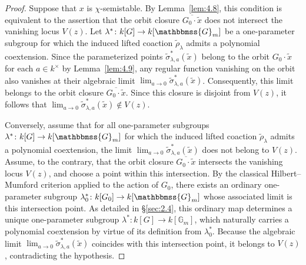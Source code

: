 \documentclass[11pt,a4paper,reqno,noamsfonts]{amsart}
\numberwithin{equation}{section}
\theoremstyle{definition}
\theoremstyle{remark}
\newcommand{\GG}{\ensuremath{\mathbbmss{G}}}
\begin{document}
\begin{proof}
Suppose that $x$ is $\chi$-semistable. By Lemma~\ref{lem:4.8}, this condition is equivalent to the assertion that the orbit closure $\overline{G_0 \cdot \tilde{x}}$ does not intersect the vanishing locus $V(z)$. Let $\lambda^* \colon k[G] \to k[\GG_m]$ be a one-parameter subgroup for which the induced lifted coaction $\tilde{\rho}_{\lambda}$ admits a polynomial coextension. Since the parameterized points $\tilde{\sigma}_{\lambda,a}^*(\tilde{x})$ belong to the orbit $G_0 \cdot \tilde{x}$ for each $a \in k^\times$ by Lemma~\ref{lem:4.9}, any regular function vanishing on the orbit also vanishes at their algebraic limit $\displaystyle \lim_{a \to 0} \tilde{\sigma}_{\lambda,a}^*(\tilde{x})$. Consequently, this limit belongs to the orbit closure $\overline{G_0 \cdot \tilde{x}}$. Since this closure is disjoint from $V(z)$, it follows that $\displaystyle\lim_{a \to 0} \tilde{\sigma}_{\lambda,a}^*(\tilde{x}) \notin V(z)$.

Conversely, assume that for all one-parameter subgroups $\lambda^* \colon k[G] \to k[\GG_m]$ for which the induced lifted coaction $\tilde{\rho}_{\lambda}$ admits a polynomial coextension, the limit $\displaystyle \lim_{a \to 0} \tilde{\sigma}_{\lambda,a}^*(\tilde{x})$ does not belong to $V(z)$. Assume, to the contrary, that the orbit closure $\overline{G_0 \cdot \tilde{x}}$ intersects the vanishing locus $V(z)$, and choose a point within this intersection. By the classical Hilbert--Mumford criterion applied to the action of $G_0$, there exists an ordinary one-parameter subgroup $\lambda_0^* \colon k[G_0] \to k[\GG_m]$ whose associated limit is this intersection point. As detailed in \S\ref{sec:2.4}, this ordinary map determines a unique one-parameter subgroup $\lambda^* \colon k[G] \to k[\mathbb{G}_m]$, which naturally carries a polynomial coextension by virtue of its definition from $\lambda_0^*$. Because the algebraic limit $\displaystyle \lim_{a \to 0} \tilde{\sigma}_{\lambda,a}^*(\tilde{x})$ coincides with this intersection point, it belongs to $V(z)$, contradicting the hypothesis.


\end{proof}
\end{document}

